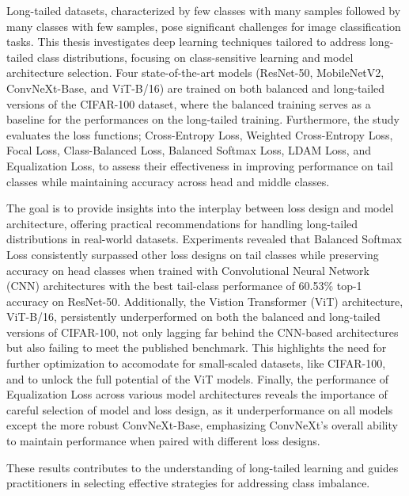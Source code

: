 Long-tailed datasets, characterized by few classes with many samples followed by many classes with few samples, pose significant challenges for image classification tasks. This thesis investigates deep learning techniques tailored to address long-tailed class distributions, focusing on class-sensitive learning and model architecture selection. Four state-of-the-art models (ResNet-50, MobileNetV2, ConvNeXt-Base, and ViT-B/16) are trained on both balanced and long-tailed versions of the CIFAR-100 dataset, where the balanced training serves as a baseline for the performances on the long-tailed training. Furthermore, the study evaluates the loss functions; Cross-Entropy Loss, Weighted Cross-Entropy Loss, Focal Loss, Class-Balanced Loss, Balanced Softmax Loss, LDAM Loss, and Equalization Loss, to assess their effectiveness in improving performance on tail classes while maintaining accuracy across head and middle classes. 

The goal is to provide insights into the interplay between loss design and model architecture, offering practical recommendations for handling long-tailed distributions in real-world datasets. Experiments revealed that Balanced Softmax Loss consistently surpassed other loss designs on tail classes while preserving accuracy on head classes when trained with Convolutional Neural Network (CNN) architectures with the best tail-class performance of 60.53\% top-1 accuracy on ResNet-50. Additionally, the Vistion Transformer (ViT) architecture, ViT-B/16, persistently underperformed on both the balanced and long-tailed versions of CIFAR-100, not only lagging far behind the CNN-based architectures but also failing to meet the published benchmark. This highlights the need for further optimization to accomodate for small-scaled datasets, like CIFAR-100, and to unlock the full potential of the ViT models. Finally, the performance of Equalization Loss across various model architectures reveals the importance of careful selection of model and loss design, as it underperformance on all models except the more robust ConvNeXt-Base, emphasizing ConvNeXt's overall ability to maintain performance when paired with different loss designs.

These results contributes to the understanding of long-tailed learning and guides practitioners in selecting effective strategies for addressing class imbalance.


